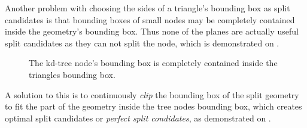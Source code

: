 Another problem with choosing the sides of a triangle's bounding box
as split candidates is that bounding boxes of small nodes may be
completely contained inside the geometry's bounding box. Thus none of
the planes are actually useful split candidates as they can not split
the node, which is demonstrated on .

\begin{figure}
  \centering
    
  \vspace{3mm}
  \parbox{5cm}{\caption[A tree node's bounding box contained in a triangle's
      bounding box.]{The kd-tree node's bounding box is completely contained
      inside the triangles bounding box.}\label{fig:aabbContained}}
\end{figure}

A solution to this is to continuously \textit{clip} the bounding box of the
split geometry to fit the part of the geometry inside the tree nodes bounding
box, which creates optimal split candidates or \textit{perfect split
  condidates}, as demonstrated on .


